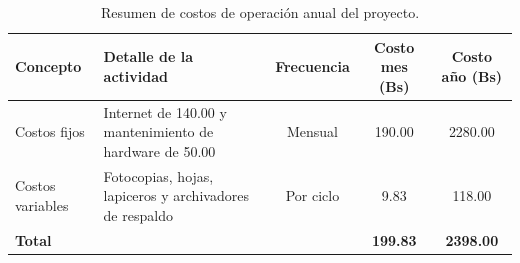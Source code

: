 \begin{table}[htbp]
    \centering
    \caption{Resumen de costos de operación anual del proyecto.}
    \label{tab:costos_operacion}
    \renewcommand{\arraystretch}{1.35}
    \begin{tabularx}{\textwidth}{L L C C C}
        \toprule
        \textbf{Concepto} & \textbf{Detalle de la actividad} & \textbf{Frecuencia} & \textbf{Costo mes (Bs)} & \textbf{Costo año (Bs)} \\
        \midrule
        Costos fijos & Internet de 140.00 y mantenimiento de hardware de 50.00 & Mensual & 190.00 & 2280.00 \\
        Costos variables & Fotocopias, hojas, lapiceros y archivadores de respaldo & Por ciclo & 9.83 & 118.00 \\
        \midrule
        \textbf{Total} & & & \textbf{199.83} & \textbf{2398.00} \\
        \bottomrule
    \end{tabularx}
\end{table}
